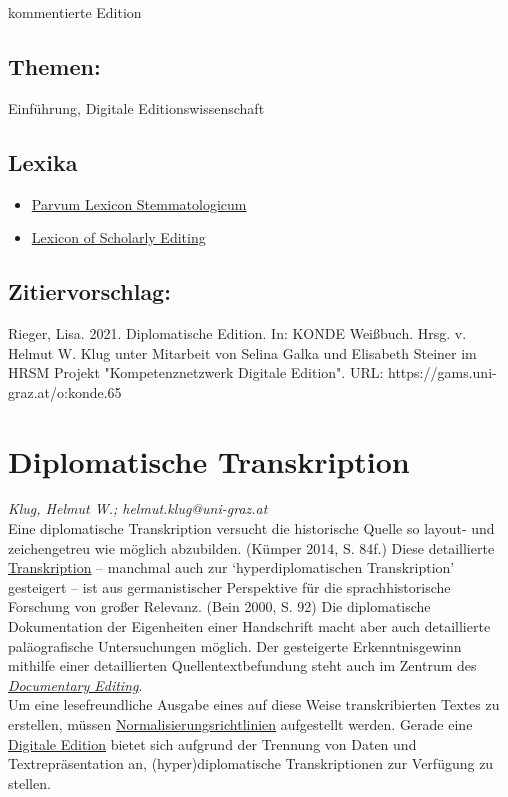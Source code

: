 \documentclass{article}
\begin{document}
{                           kommentierte Edition}\subsection*{Themen:}Einführung, Digitale Editionswissenschaft\subsection*{Lexika}\begin{itemize}\item \href{https://wiki.helsinki.fi/display/stemmatology/Edition%2C+diplomatic}{Parvum Lexicon Stemmatologicum}\item \href{https://lexiconse.uantwerpen.be/index.php/lexicon/edition-diplomatic/}{Lexicon of Scholarly Editing}\end{itemize}\subsection*{Zitiervorschlag:}Rieger, Lisa. 2021. Diplomatische Edition. In: KONDE Weißbuch. Hrsg. v. Helmut W. Klug unter Mitarbeit von Selina Galka und Elisabeth Steiner im HRSM Projekt "Kompetenznetzwerk Digitale Edition". URL: https://gams.uni-graz.at/o:konde.65\newpage\section*{Diplomatische Transkription} \emph{Klug, Helmut W.; helmut.klug@uni-graz.at }\\
        
    Eine diplomatische Transkription versucht die historische Quelle so layout- und zeichengetreu wie möglich abzubilden. (Kümper 2014, S. 84f.) Diese detaillierte \href{http://gams.uni-graz.at/o:konde.197}{Transkription} – manchmal auch zur ‘hyperdiplomatischen Transkription’ gesteigert – ist aus germanistischer Perspektive für die sprachhistorische Forschung von großer Relevanz. (Bein 2000, S. 92) Die diplomatische Dokumentation der Eigenheiten einer Handschrift macht aber auch detaillierte paläografische Untersuchungen möglich. Der gesteigerte Erkenntnisgewinn mithilfe einer detaillierten Quellentextbefundung steht auch im Zentrum des \emph{\href{http://gams.uni-graz.at/o:konde.72}{Documentary Editing}}. \\
            
        Um eine lesefreundliche Ausgabe eines auf diese Weise transkribierten Textes zu erstellen, müssen \href{http://gams.uni-graz.at/o:konde.146}{Normalisierungsrichtlinien} aufgestellt werden. Gerade eine \href{http://gams.uni-graz.at/o:konde.59}{Digitale Edition} bietet sich aufgrund der Trennung von Daten und Textrepräsentation an, (hyper)diplomatische Transkriptionen zur Verfügung zu stellen. \\
            
\end{document}
